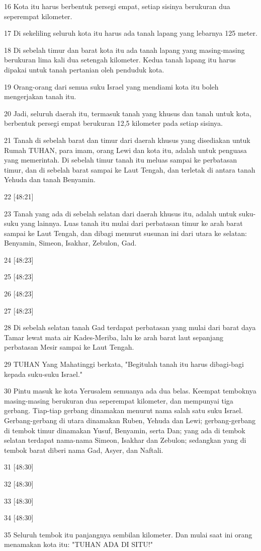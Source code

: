 \par 16 Kota itu harus berbentuk persegi empat, setiap sisinya berukuran dua seperempat kilometer.
\par 17 Di sekeliling seluruh kota itu harus ada tanah lapang yang lebarnya 125 meter.
\par 18 Di sebelah timur dan barat kota itu ada tanah lapang yang masing-masing berukuran lima kali dua setengah kilometer. Kedua tanah lapang itu harus dipakai untuk tanah pertanian oleh penduduk kota.
\par 19 Orang-orang dari semua suku Israel yang mendiami kota itu boleh mengerjakan tanah itu.
\par 20 Jadi, seluruh daerah itu, termasuk tanah yang khusus dan tanah untuk kota, berbentuk persegi empat berukuran 12,5 kilometer pada setiap sisinya.
\par 21 Tanah di sebelah barat dan timur dari daerah khusus yang disediakan untuk Rumah TUHAN, para imam, orang Lewi dan kota itu, adalah untuk penguasa yang memerintah. Di sebelah timur tanah itu meluas sampai ke perbatasan timur, dan di sebelah barat sampai ke Laut Tengah, dan terletak di antara tanah Yehuda dan tanah Benyamin.
\par 22 [48:21]
\par 23 Tanah yang ada di sebelah selatan dari daerah khusus itu, adalah untuk suku-suku yang lainnya. Luas tanah itu mulai dari perbatasan timur ke arah barat sampai ke Laut Tengah, dan dibagi menurut susunan ini dari utara ke selatan: Benyamin, Simeon, Isakhar, Zebulon, Gad.
\par 24 [48:23]
\par 25 [48:23]
\par 26 [48:23]
\par 27 [48:23]
\par 28 Di sebelah selatan tanah Gad terdapat perbatasan yang mulai dari barat daya Tamar lewat mata air Kades-Meriba, lalu ke arah barat laut sepanjang perbatasan Mesir sampai ke Laut Tengah.
\par 29 TUHAN Yang Mahatinggi berkata, "Begitulah tanah itu harus dibagi-bagi kepada suku-suku Israel."
\par 30 Pintu masuk ke kota Yerusalem semuanya ada dua belas. Keempat temboknya masing-masing berukuran dua seperempat kilometer, dan mempunyai tiga gerbang. Tiap-tiap gerbang dinamakan menurut nama salah satu suku Israel. Gerbang-gerbang di utara dinamakan Ruben, Yehuda dan Lewi; gerbang-gerbang di tembok timur dinamakan Yusuf, Benyamin, serta Dan; yang ada di tembok selatan terdapat nama-nama Simeon, Isakhar dan Zebulon; sedangkan yang di tembok barat diberi nama Gad, Asyer, dan Naftali.
\par 31 [48:30]
\par 32 [48:30]
\par 33 [48:30]
\par 34 [48:30]
\par 35 Seluruh tembok itu panjangnya sembilan kilometer. Dan mulai saat ini orang menamakan kota itu: "TUHAN ADA DI SITU!"


